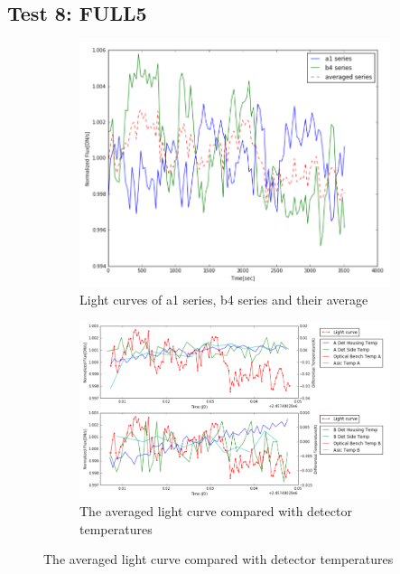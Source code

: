 \documentclass[conference]{IEEEtran}
\begin{document}
\subsection{Test 8: FULL5} 
\begin{figure}[H]
    \centering
    \begin{subfigure}{1}
        \includegraphics[scale=0.4]{ts_test8}
        \caption{Light curves of a1 series, b4 series and their average}
    \end{subfigure}

    \begin{subfigure}{2}
        \includegraphics[scale=0.4]{temp_test8}
        \caption{The averaged light curve compared with detector temperatures}
    \end{subfigure}
   

\end{figure}
\end{document}
